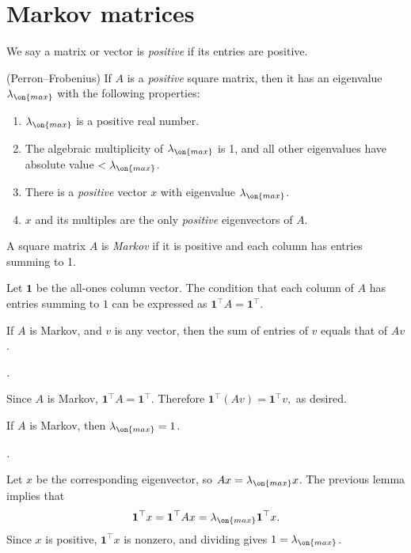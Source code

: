 \documentclass[10pt]{amsart}
\makeatletter
\renewenvironment{proof}[1][\proofname]{\par
	\pushQED{\qed}%
	\normalfont \topsep6\p@\@plus6\p@\relax
	\noindent\emph{#1.} 
	\ignorespaces
}{%
\popQED\endtrivlist\@endpefalse
}
\theoremstyle{mythm}
\theoremstyle{definition}
\theoremstyle{myrmk}
\newenvironment{myproof}{\color{myblue}\begin{proof}}{\end{proof}}
\makeatother
\begin{document}
	\thispagestyle{fancy}
	
	\section{Markov matrices} 
	
	 We say a matrix or vector is \emph{positive} if its entries are positive. 
	
	 (Perron--Frobenius) If $A$ is a \emph{positive} square matrix, then it has an eigenvalue $\lambda_{\on{max}}$ with the following properties: 
	\begin{enumerate}[label=(\roman*)]
		\item $\lambda_{\on{max}}$ is a positive real number. 
		\item The algebraic multiplicity of $\lambda_{\on{max}}$ is 1, and all other eigenvalues have absolute value $< \lambda_{\on{max}}$. 
		\item There is a \emph{positive} vector $x$ with eigenvalue $\lambda_{\on{max}}$. 
		\item $x$ and its multiples are the only \emph{positive} eigenvectors of $A$. 
	\end{enumerate}
	
	 A square matrix $A$ is \emph{Markov} if it is positive and each column has entries summing to 1. 
	
	Let $\mathbf{1}$ be the all-ones column vector. The condition that each column of $A$ has entries summing to $1$ can be expressed as $\mathbf{1}^\top A = \mathbf{1}^\top$. 
	
	 If $A$ is Markov, and $v$ is any vector, then the sum of entries of $v$ equals that of $Av$. 
	\begin{myproof}
		Since $A$ is Markov, $\mathbf{1}^\top A = \mathbf{1}^\top$. Therefore 
		$
			\mathbf{1}^\top (Av) = \mathbf{1}^\top v,
		$
		as desired. 
	\end{myproof}
	
	 If $A$ is Markov, then $\lambda_{\on{max}} = 1$. 
	\begin{myproof}
		Let $x$ be the corresponding eigenvector, so $Ax = \lambda_{\on{max}}x$. The previous lemma implies that 
		\[
			\mathbf{1}^\top x = \mathbf{1}^{\top} Ax = \lambda_{\on{max}} \mathbf{1}^\top x. 
		\]
		Since $x$ is positive, $\mathbf{1}^\top x$ is nonzero, and dividing gives $1 = \lambda_{\on{max}}$. 
	\end{myproof}
	
\end{document}
